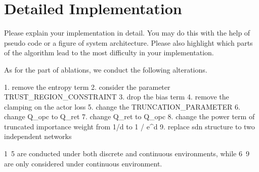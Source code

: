 \section{Detailed Implementation}
\label{section:implementation}
Please explain your implementation in detail. You may do this with the help of pseudo code or a figure of system architecture. Please also highlight which parts of the algorithm lead to the most difficulty in your implementation.


As for the part of ablations, we conduct the following alterations. 

1. remove the entropy term
2. consider the parameter TRUST_REGION_CONSTRAINT
3. drop the bias term 
4. remove the clamping on the actor loss
5. change the TRUNCATION_PARAMETER
6. change Q_opc to Q_ret 
7. change Q_ret to Q_opc
8. change the power term of truncated importance weight from 1/d to 1 / e^d 
9. replace sdn structure to two independent networks

1~5 are conducted under both discrete and continuous environments, while 6~9 are only considered under continuous environment.

